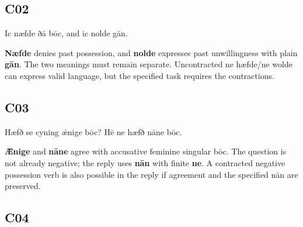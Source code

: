 \subsection*{C02}

\par\begin{minipage}{\linewidth}\raggedright
Ic næfde ðā bōc, and ic nolde gān.

\textbf{Næfde} denies past possession, and \textbf{nolde} expresses past unwillingness with plain \textbf{gān}. The two meanings must remain separate. Uncontracted ne hæfde/\allowbreak{}ne wolde can express valid language, but the specified task requires the contractions.

\end{minipage}\par\addvspace{4pt}

\subsection*{C03}

\par\begin{minipage}{\linewidth}\raggedright
Hæfð se cyning ǣnige bōc? Hē ne hæfð nāne bōc.

\textbf{Ǣnige} and \textbf{nāne} agree with accusative feminine singular bōc. The question is not already negative; the reply uses \textbf{nān} with finite \textbf{ne}. A contracted negative possession verb is also possible in the reply if agreement and the specified nān are preserved.

\end{minipage}\par\addvspace{4pt}

\subsection*{C04}

